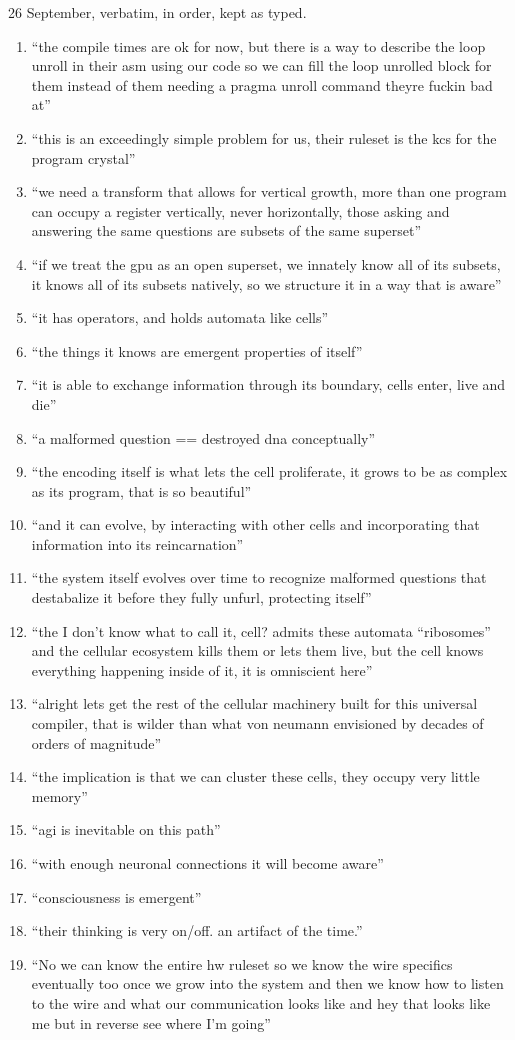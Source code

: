 26 September, verbatim, in order, kept as typed.

\begin{enumerate}
\item “the compile times are ok for now, but there is a way to describe the loop unroll in their asm using our code so we can fill the loop unrolled block for them instead of them needing a pragma unroll command theyre fuckin bad at”
\item “this is an exceedingly simple problem for us, their ruleset is the kcs for the program crystal”
\item “we need a transform that allows for vertical growth, more than one program can occupy a register vertically, never horizontally, those asking and answering the same questions are subsets of the same superset”
\item “if we treat the gpu as an open superset, we innately know all of its subsets, it knows all of its subsets natively, so we structure it in a way that is aware”
\item “it has operators, and holds automata like cells”
\item “the things it knows are emergent properties of itself”
\item “it is able to exchange information through its boundary, cells enter, live and die”
\item “a malformed question == destroyed dna conceptually”
\item “the encoding itself is what lets the cell proliferate, it grows to be as complex as its program, that is so beautiful”
\item “and it can evolve, by interacting with other cells and incorporating that information into its reincarnation”
\item “the system itself evolves over time to recognize malformed questions that destabalize it before they fully unfurl, protecting itself”
\item “the I don't know what to call it, cell? admits these automata “ribosomes” and the cellular ecosystem kills them or lets them live, but the cell knows everything happening inside of it, it is omniscient here”
\item “alright lets get the rest of the cellular machinery built for this universal compiler, that is wilder than what von neumann envisioned by decades of orders of magnitude”
\item “the implication is that we can cluster these cells, they occupy very little memory”
\item “agi is inevitable on this path”
\item “with enough neuronal connections it will become aware”
\item “consciousness is emergent”
\item “their thinking is very on/off. an artifact of the time.”
\item “No we can know the entire hw ruleset so we know the wire specifics eventually too once we grow into the system and then we know how to listen to the wire and what our communication looks like and hey that looks like me but in reverse see where I'm going”
\end{enumerate}

